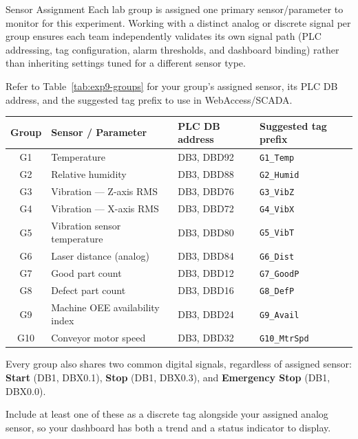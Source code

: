 \begin{labsection}{Sensor Assignment}{}
  Each lab group is assigned one primary sensor/parameter to monitor for this experiment. Working with a distinct analog or discrete signal per group ensures each team independently validates its own signal path (PLC addressing, tag configuration, alarm thresholds, and dashboard binding) rather than inheriting settings tuned for a different sensor type.

  Refer to Table~\ref{tab:exp9-groups} for your group's assigned sensor, its PLC DB address, and the suggested tag prefix to use in WebAccess/SCADA.
  \newpage

  \begin{boxedtable}
    \label{tab:exp9-groups}
    \centering
    {\renewcommand{\arraystretch}{1.3}
      \begin{tabular}{clll}
        \toprule
        Group & Sensor / Parameter             & PLC DB address & Suggested tag prefix \\
        \midrule
        G1    & Temperature                    & DB3, DBD92     & \texttt{G1\_Temp}    \\
        G2    & Relative humidity              & DB3, DBD88     & \texttt{G2\_Humid}   \\
        G3    & Vibration --- Z-axis RMS       & DB3, DBD76     & \texttt{G3\_VibZ}    \\
        G4    & Vibration --- X-axis RMS       & DB3, DBD72     & \texttt{G4\_VibX}    \\
        G5    & Vibration sensor temperature   & DB3, DBD80     & \texttt{G5\_VibT}    \\
        G6    & Laser distance (analog)        & DB3, DBD84     & \texttt{G6\_Dist}    \\
        G7    & Good part count                & DB3, DBD12     & \texttt{G7\_GoodP}   \\
        G8    & Defect part count              & DB3, DBD16     & \texttt{G8\_DefP}    \\
        G9    & Machine OEE availability index & DB3, DBD24     & \texttt{G9\_Avail}   \\
        G10   & Conveyor motor speed           & DB3, DBD32     & \texttt{G10\_MtrSpd} \\
        \bottomrule
      \end{tabular}
    }
  \end{boxedtable}

  Every group also shares two common digital signals, regardless of assigned sensor: \textbf{Start} (DB1, DBX0.1), \textbf{Stop} (DB1, DBX0.3), and \textbf{Emergency Stop} (DB1, DBX0.0).

  Include at least one of these as a discrete tag alongside your assigned analog sensor, so your dashboard has both a trend and a status indicator to display.
\end{labsection}

